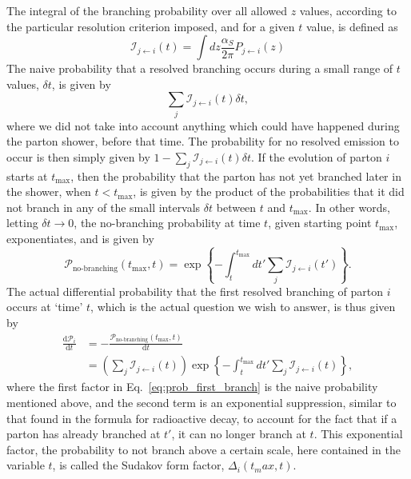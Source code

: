 The integral of the branching probability over all allowed $z$ values, according to the
particular resolution criterion imposed, and for a given $t$ value, is defined as
\begin{equation}
  \mathcal{I}_{j\leftarrow i}(t) = \int dz \frac{\alpha_S}{2\pi} P_{j\leftarrow i}(z)
\end{equation}
The naive probability that a resolved branching occurs during a small range of $t$ values, $\delta
t$, is given by 
\begin{equation}
 \sum_j \mathcal{I}_{j\leftarrow i}(t) \delta t,
\end{equation}
where we did not take into account anything which could have happened during the parton shower,
before that time. The probability for no resolved emission to occur is then simply given by $1 -
\sum_j \mathcal{I}_{j\leftarrow i}(t) \delta t$. 
If the evolution of parton $i$ starts at $t_{\text{max}}$, then the probability that the parton
has not yet branched later in the shower, when $t < t_{\text{max}}$, is given by
the product of the probabilities that it did not branch in any of the small intervals $\delta t$
between $t$ and $t_{\text{max}}$. In other words, letting $\delta t \rightarrow 0$, the no-branching
probability at time $t$, given starting point $t_{\text{max}}$, exponentiates, and is given by
\begin{equation}
  \mathcal{P}_{\text{no-branching}}(t_{\text{max}},t) = \exp 
  \left\{ - \int_t^{t_{\text{max}}} dt' \sum_j \mathcal{I}_{j\leftarrow i}(t') \right\} .
\end{equation}
The actual differential probability that the first resolved branching of parton $i$ occurs at `time'
$t$, which is the actual question we wish to answer, is thus given by
\begin{align}
  \frac{\text{d}\mathcal{P}_i}{\text{d}t} &= -
\frac{\mathcal{P}_{\text{no-branching}}(t_{\text{max}},t)}{\text{d}t} \\
 &= \left( \sum_j \mathcal{I}_{j\leftarrow i}(t)\right) \exp \left\{ - \int_t^{t_{\text{max}}} dt'
\sum_j \mathcal{I}_{j\leftarrow i}(t) \right\}, \label{eq:prob_first_branch}
\end{align}
where the first factor in Eq.~\ref{eq:prob_first_branch} is the naive probability mentioned above,
and the second term is an exponential suppression, similar to that found in the formula for
radioactive decay, to account for the fact that if a parton has already branched at $t'$, it can no
longer branch at $t$. 
This exponential factor, the probability to not branch above a certain scale, here
contained in the variable $t$, is called the Sudakov form factor, $\Delta_i(t_max,t)$. 

